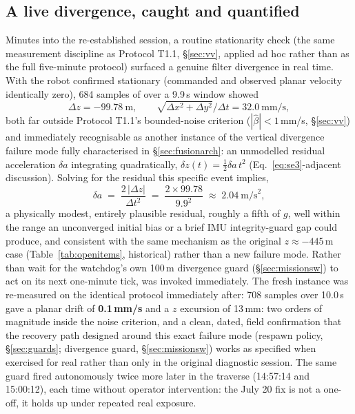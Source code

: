 \subsection{A live divergence, caught and quantified}
\label{sec:livedivergence}
Minutes into the re-established session, a routine stationarity check
(the same measurement discipline as Protocol T1.1, \S\ref{sec:vv}, applied
ad hoc rather than as the full five-minute protocol) surfaced a genuine
filter divergence in real time. With the robot confirmed stationary
(commanded and observed planar velocity identically zero), 684 samples of
 over a 9.9\,s window showed
\begin{equation}
\Delta z = -99.78\ \text{m}, \qquad
\sqrt{\Delta x^2+\Delta y^2} \big/ \Delta t = 32.0\ \text{mm/s},
\end{equation}
both far outside Protocol T1.1's bounded-noise criterion
($|\hat\beta|<1$\,mm/s, \S\ref{sec:vv}) and immediately recognisable as
another instance of the vertical divergence failure mode fully
characterised in \S\ref{sec:fusionarch}: an unmodelled residual
acceleration $\delta a$ integrating quadratically,
$\delta z(t) = \tfrac{1}{2}\delta a\,t^2$ (Eq.~\ref{eq:se3}-adjacent
discussion). Solving for the residual this specific event implies,
\begin{equation}
\delta a \;=\; \frac{2\,|\Delta z|}{\Delta t^{2}}
\;=\; \frac{2 \times 99.78}{9.9^{2}}
\;\approx\; 2.04\ \text{m/s}^2,
\end{equation}
a physically modest, entirely plausible residual, roughly a fifth of
$g$, well within the range an unconverged initial bias or a brief IMU
integrity-guard gap could produce, and consistent with the same mechanism
as the original $z\approx-445$\,m case (Table~\ref{tab:openitems},
historical) rather than a new failure mode. Rather than wait for the
watchdog's own 100\,m divergence guard (\S\ref{sec:missionsw}) to act on
its next one-minute tick,  was invoked immediately.
The fresh instance was re-measured on the identical protocol immediately
after: 708 samples over 10.0\,s gave a planar drift of \textbf{0.1\,mm/s}
and a $z$ excursion of 13\,mm: two orders of magnitude inside the
noise criterion, and a clean, dated, field confirmation that the recovery
path designed around this exact failure mode (respawn policy,
\S\ref{sec:guards}; divergence guard, \S\ref{sec:missionsw}) works as
specified when exercised for real rather than only in the original
diagnostic session. The same guard fired autonomously twice more later in
the traverse (14:57:14 and 15:00:12), each time without operator
intervention: the July 20 fix is not a one-off, it holds up under repeated
real exposure.

